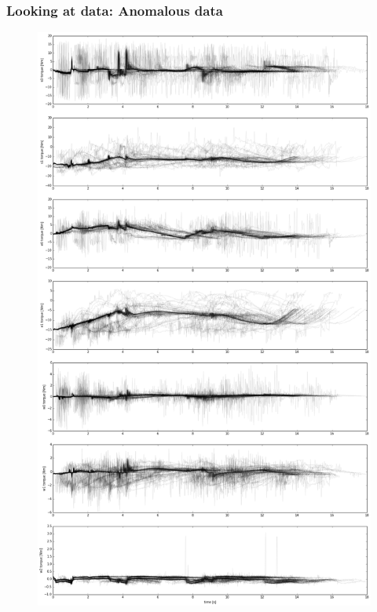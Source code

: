 \documentclass{beamer}
\newcommand{\datawidth}{.43\textwidth}
\begin{document}
    \begin{frame}
        \frametitle{Looking at data: Anomalous data}
        \begin{figure}
            \centering
            \includegraphics[width=\datawidth]{figs/controller_broke3.png}
        \end{figure}
    \end{frame}
\end{document}
